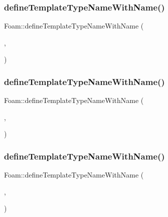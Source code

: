 \subsubsection{\texorpdfstring{define\+Template\+Type\+Name\+With\+Name()}{defineTemplateTypeNameWithName()}\hspace{0.1cm}{\footnotesize\ttfamily [2/13]}}
{\footnotesize\ttfamily Foam\+::define\+Template\+Type\+Name\+With\+Name (\begin{DoxyParamCaption}\item[{\hyperlink{classFoam_1_1registeredObject}{registered\+Object}$<$ word $>$}]{,  }\item[{\char`\"{}reg\+Word\char`\"{}}]{ }\end{DoxyParamCaption})}

\mbox{\label{namespaceFoam_ae1105e5c7c72c6a06cfd5725ad18e789}} 
\subsubsection{\texorpdfstring{define\+Template\+Type\+Name\+With\+Name()}{defineTemplateTypeNameWithName()}\hspace{0.1cm}{\footnotesize\ttfamily [3/13]}}
{\footnotesize\ttfamily Foam\+::define\+Template\+Type\+Name\+With\+Name (\begin{DoxyParamCaption}\item[{\hyperlink{classFoam_1_1registeredObject}{registered\+Object}$<$ label $>$}]{,  }\item[{\char`\"{}reg\+Label\char`\"{}}]{ }\end{DoxyParamCaption})}

\mbox{\label{namespaceFoam_a8a0acabced698824d8b0c35114c7b17a}} 
\subsubsection{\texorpdfstring{define\+Template\+Type\+Name\+With\+Name()}{defineTemplateTypeNameWithName()}\hspace{0.1cm}{\footnotesize\ttfamily [4/13]}}
{\footnotesize\ttfamily Foam\+::define\+Template\+Type\+Name\+With\+Name (\begin{DoxyParamCaption}\item[{\hyperlink{classFoam_1_1registeredObject}{registered\+Object}$<$ scalar $>$}]{,  }\item[{\char`\"{}reg\+Scalar\char`\"{}}]{ }\end{DoxyParamCaption})}

